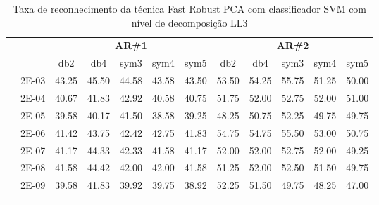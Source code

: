 \begin{table}[H]
\begin{tabular}{|c|c|c c c c c|c c c c c|}
\\\midrule
\end{tabular}

\end{table}


\begin{table}[H]
	\centering
    \normalsize
	\caption{Taxa de reconhecimento da técnica Fast Robust PCA com classificador SVM com nível de decomposição LL3}
	\begin{tabular}{|c|c|c c c c c|c c c c c|}
\cline{3-12}
\multicolumn{2}{c|}{\multirow{2}{*}{}} & \multicolumn{5}{c|}{\textbf{AR\#1}}  & \multicolumn{5}{c|}{\textbf{AR\#2}} \\\cline{3-12}

\multicolumn{2}{c|}{}  & db2 & db4 & sym3 & sym4 & sym5 & db2 & db4& sym3 & sym4 & sym5 \\\hline
\multicolumn{1}{|c|}{ \multirow{6}{*}{\rotatebox[origin=c]{90}{\textbf{Gamma}}} }
&2E-03&	43.25&	45.50&	44.58&	43.58&	43.50&	53.50	&54.25&	55.75&	51.25&	50.00	\\\cline{2-12}
&2E-04&	40.67&	41.83&	42.92&	40.58&	40.75&	51.75	&52.00&	52.75&	52.00&	51.00	\\\cline{2-12}
&2E-05&	39.58&	40.17&	41.50&	38.58&	39.25&	48.25	&50.75&	52.25&	49.75&	49.75	\\\cline{2-12}
&2E-06&	41.42&	43.75&	42.42&	42.75&	41.83&	54.75	&54.75&	55.50&	53.00&	50.75	\\\cline{2-12}
&2E-07&	41.17&	44.33&	42.33&	41.58&	41.17&	52.00	&52.00&	52.75&	52.00&	49.25	\\\cline{2-12}
&2E-08&	41.58&	44.42&	42.00&	42.00&	41.58&	51.25	&52.00&	52.50&	51.50&	49.75	\\\cline{2-12}
&2E-09&	39.58&	41.83&	39.92&	39.75&	38.92&	52.25	&51.50&	49.75&	48.25&	47.00	


\\ \midrule
\multicolumn{12}{c}{}\\ 


\end{tabular}
\end{table}
